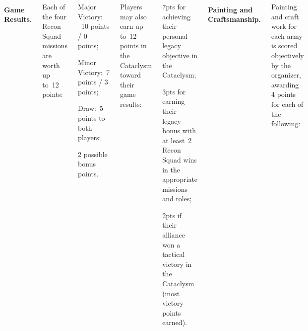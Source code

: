 \begin{columns}
\clearpage
\paragraph{Game Results.} 

Each of the four Recon Squad missions are worth up to~12 points:


\begin{squishitemize}
\item Major Victory: ~10 points / 0 points;
\item Minor Victory:~7 points / 3 points;
\item Draw:~5 points to both players;
\item 2 possible bonus points.
\end{squishitemize}


Players may also earn up to~12 points in the Cataclysm toward their
game results:
\begin{squishitemize}
\item 7pts for achieving their personal legacy objective in the Cataclysm;
\item 3pts for earning their legacy bonus with at least~2 Recon Squad wins in
  the appropriate missions and roles;
\item 2pts if their alliance won a tactical victory in the
  Cataclysm (most victory points earned).
\end{squishitemize}

\paragraph{Painting and Craftsmanship.} 

Painting and craft work for each army is scored objectively by the
organizer, awarding 4 points for each of the following:


\end{columns}
